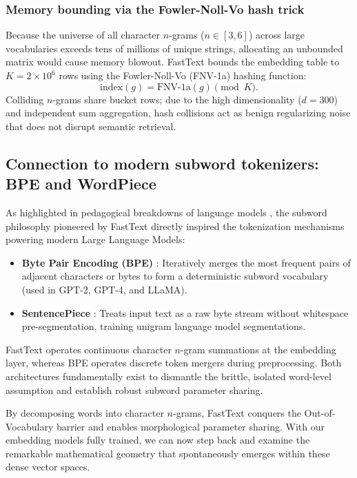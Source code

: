 \documentclass[../../main.tex]{subfiles}
\begin{document}
\subsubsection{Memory bounding via the Fowler-Noll-Vo hash trick}
Because the universe of all character $n$-grams ($n \in [3, 6]$) across large vocabularies exceeds tens of millions of unique strings, allocating an unbounded matrix would cause memory blowout. FastText bounds the embedding table to $K = 2 \times 10^6$ rows using the Fowler-Noll-Vo (FNV-1a) hashing function:
\begin{equation}
\label{eq:fnv_hash}
\text{index}(g) = \text{FNV-1a}(g) \pmod K.
\end{equation}
Colliding $n$-grams share bucket rows; due to the high dimensionality ($d = 300$) and independent sum aggregation, hash collisions act as benign regularizing noise that does not disrupt semantic retrieval.

\subsection{Connection to modern subword tokenizers: BPE and WordPiece}
\label{subsec:subword_tokenizers_link}

As highlighted in pedagogical breakdowns of language models \cite{enkk2023embeddings}, the subword philosophy pioneered by FastText directly inspired the tokenization mechanisms powering modern Large Language Models:
\begin{itemize}
    \item \textbf{Byte Pair Encoding (BPE)} \cite{sennrich2016,radford2019}: Iteratively merges the most frequent pairs of adjacent characters or bytes to form a deterministic subword vocabulary (used in GPT-2, GPT-4, and LLaMA).
    \item \textbf{SentencePiece} \cite{kudo2018}: Treats input text as a raw byte stream without whitespace pre-segmentation, training unigram language model segmentations.
\end{itemize}
FastText operates continuous character $n$-gram summations at the embedding layer, whereas BPE operates discrete token mergers during preprocessing. Both architectures fundamentally exist to dismantle the brittle, isolated word-level assumption and establish robust subword parameter sharing.

By decomposing words into character $n$-grams, FastText conquers the Out-of-Vocabulary barrier and enables morphological parameter sharing. With our embedding models fully trained, we can now step back and examine the remarkable mathematical geometry that spontaneously emerges within these dense vector spaces.
\end{document}
